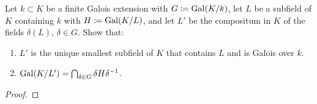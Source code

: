 \begin{problem}
Let $k\subset K$ be a finite Galois extension with $G\coloneqq\operatorname{Gal}(K/k)$,
let $L$ be a subfield of $K$ containing $k$ with $H\coloneqq\operatorname{Gal}(K/L)$, and
let $L'$ be the compositum in $K$ of the fields $\delta(L)$, $\delta\in
G$. Show that:
\begin{enumerate}[label=(\alph*),noitemsep]
\item $L'$ is the unique smallest subfield of $K$ that contains $L$ and is
  Galois over $k$.
\item $\operatorname{Gal}(K/L')=\bigcap_{\delta\in G}\delta H\delta^{-1}$.
\end{enumerate}
\end{problem}
\begin{proof}
\end{proof}

